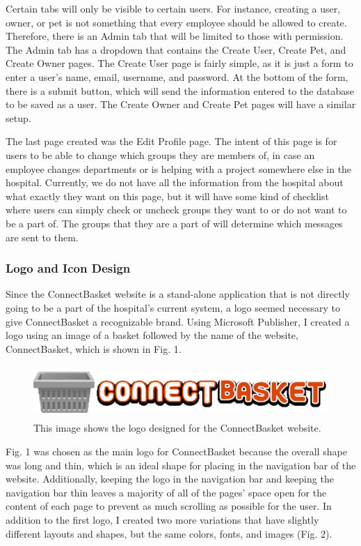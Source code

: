 \documentclass[onecolumn, draftclsnofoot,10pt, compsoc]{IEEEtran}
\begin{document}
Certain tabs will only be visible to certain users. For instance, creating a user, owner, or pet is not something that every employee should be allowed to create. Therefore, there is an Admin tab that will be limited to those with permission. The Admin tab has a dropdown that contains the Create User, Create Pet, and Create Owner pages.  The Create User page is fairly simple, as it is just a form to enter a user's name, email, username, and password. At the bottom of the form, there is a submit button, which will send the information entered to the database to be saved as a user. The Create Owner and Create Pet pages will have a similar setup. 

The last page created was the Edit Profile page. The intent of this page is for users to be able to change which groups they are members of, in case an employee changes departments or is helping with a project somewhere else in the hospital. Currently, we do not have all the information from the hospital about what exactly they want on this page, but it will have some kind of checklist where users can simply check or uncheck groups they want to or do not want to be a part of. The groups that they are a part of will determine which messages are sent to them. 

\subsubsection{Logo and Icon Design}
Since the ConnectBasket website is a stand-alone application that is not directly going to be a part of the hospital's current system, a logo seemed necessary to give ConnectBasket a recognizable brand. Using Microsoft Publisher, I created a logo using an image of a basket followed by the name of the website, ConnectBasket, which is shown in Fig. 1. 

\begin{figure}[h!]
\caption{This image shows the logo designed for the ConnectBasket website. }
\includegraphics[height=2cm]{logo_one}
\end{figure}

Fig. 1 was chosen as the main logo for ConnectBasket because the overall shape was long and thin, which is an ideal shape for placing in the navigation bar of the website. Additionally, keeping the logo in the navigation bar and keeping the navigation bar thin leaves a majority of all of the pages' space open for the content of each page to prevent as much scrolling as possible for the user. In addition to the first logo, I created two more variations that have slightly different layouts and shapes, but the same colors, fonts, and images (Fig. 2). 
\end{document}

